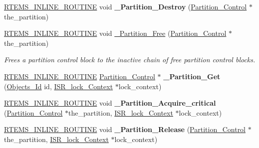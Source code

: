 \begin{DoxyCompactItemize}
\mbox{\hyperlink{group__RTEMSScoreBaseDefs_gac216239df231d5dbd15e3520b0b9313f}{R\+T\+E\+M\+S\+\_\+\+I\+N\+L\+I\+N\+E\+\_\+\+R\+O\+U\+T\+I\+NE}} void {\bfseries \+\_\+\+Partition\+\_\+\+Destroy} (\mbox{\hyperlink{structPartition__Control}{Partition\+\_\+\+Control}} $\ast$the\+\_\+partition)
\item 
\mbox{\hyperlink{group__RTEMSScoreBaseDefs_gac216239df231d5dbd15e3520b0b9313f}{R\+T\+E\+M\+S\+\_\+\+I\+N\+L\+I\+N\+E\+\_\+\+R\+O\+U\+T\+I\+NE}} void \mbox{\hyperlink{group__ClassicPartImpl_ga40e5c822d71dc4b38c696d2061608c55}{\+\_\+\+Partition\+\_\+\+Free}} (\mbox{\hyperlink{structPartition__Control}{Partition\+\_\+\+Control}} $\ast$the\+\_\+partition)
\begin{DoxyCompactList}\small\item\em Frees a partition control block to the inactive chain of free partition control blocks. \end{DoxyCompactList}\item 
\mbox{\label{group__ClassicPartImpl_gaba43c940d51e5578b9cc26f928c72ad9}} 
\mbox{\hyperlink{group__RTEMSScoreBaseDefs_gac216239df231d5dbd15e3520b0b9313f}{R\+T\+E\+M\+S\+\_\+\+I\+N\+L\+I\+N\+E\+\_\+\+R\+O\+U\+T\+I\+NE}} \mbox{\hyperlink{structPartition__Control}{Partition\+\_\+\+Control}} $\ast$ {\bfseries \+\_\+\+Partition\+\_\+\+Get} (\mbox{\hyperlink{group__RTEMSScoreObject_ga5821f52a51072941bdd603e542d0863e}{Objects\+\_\+\+Id}} id, \mbox{\hyperlink{structISR__lock__Context}{I\+S\+R\+\_\+lock\+\_\+\+Context}} $\ast$lock\+\_\+context)
\item 
\mbox{\label{group__ClassicPartImpl_ga633c7f5ca965f8545d28ce9b771f4f53}} 
\mbox{\hyperlink{group__RTEMSScoreBaseDefs_gac216239df231d5dbd15e3520b0b9313f}{R\+T\+E\+M\+S\+\_\+\+I\+N\+L\+I\+N\+E\+\_\+\+R\+O\+U\+T\+I\+NE}} void {\bfseries \+\_\+\+Partition\+\_\+\+Acquire\+\_\+critical} (\mbox{\hyperlink{structPartition__Control}{Partition\+\_\+\+Control}} $\ast$the\+\_\+partition, \mbox{\hyperlink{structISR__lock__Context}{I\+S\+R\+\_\+lock\+\_\+\+Context}} $\ast$lock\+\_\+context)
\item 
\mbox{\label{group__ClassicPartImpl_ga02b0062a06e528f725efcafac89211b1}} 
\mbox{\hyperlink{group__RTEMSScoreBaseDefs_gac216239df231d5dbd15e3520b0b9313f}{R\+T\+E\+M\+S\+\_\+\+I\+N\+L\+I\+N\+E\+\_\+\+R\+O\+U\+T\+I\+NE}} void {\bfseries \+\_\+\+Partition\+\_\+\+Release} (\mbox{\hyperlink{structPartition__Control}{Partition\+\_\+\+Control}} $\ast$the\+\_\+partition, \mbox{\hyperlink{structISR__lock__Context}{I\+S\+R\+\_\+lock\+\_\+\+Context}} $\ast$lock\+\_\+context)
\end{DoxyCompactItemize}
